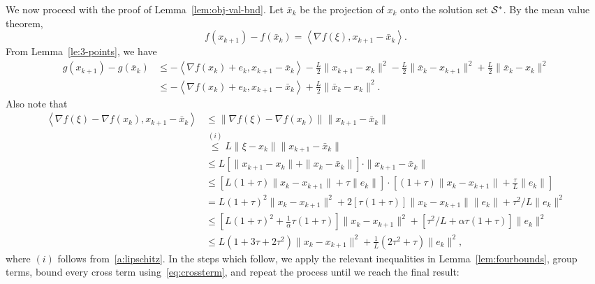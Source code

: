 We now proceed with the proof of Lemma~\ref{lem:obj-val-bnd}.  Let
$\bar{x}_k$ be the projection of $x_k$ onto the solution set
$\mathcal{S^*}$. By the mean value theorem,
\begin{equation} \label{eq:eq_mv}
  f(x_{k+1})-f(\bar{x}_k)
  = \left\langle \nabla f(\xi),x_{k+1}-\bar{x}_k\right\rangle.
\end{equation}
From Lemma~\ref{le:3-points}, we have
\begin{align} \label{eq:eq_3pt1}
g(x_{k+1})-g(\bar{x}_k) 
& \leq-\left\langle \nabla f(x_{k})
  +e_{k},x_{k+1}-\bar{x}_k\right\rangle \nonumber 
  -\frac{L}{2}\|x_{k+1}-x_{k}\|^{2}
  -\frac{L}{2}\|\bar{x}_k-x_{k+1}\|^{2}
  +\frac{L}{2}\|\bar{x}_k-x_{k}\|^{2}\nonumber \\
& \leq-\left\langle \nabla f(x_{k})
  +e_{k},x_{k+1}-\bar{x}_k\right\rangle 
  +\frac{L}{2}\|\bar{x}_k-x_{k}\|^{2}.
\end{align}
Also note that
\begin{align*}
\left\langle \nabla f(\xi)-\nabla f(x_{k}),x_{k+1}-\bar{x}_k\right\rangle 
 &\leq\|\nabla f(\xi)-\nabla f(x_{k})\|\|x_{k+1}-\bar{x}_k\|
\\&\overset{(i)}{\leq}L\|\xi-x_{k}\|\|x_{k+1}-\bar{x}_k\|
\\&\leq L[\|x_{k+1}-x_{k}\|+\|x_{k}-\bar{x}_k\|]\cdot\|x_{k+1}-\bar{x}_k\|
\\&\leq[L(1+\tau)\|x_{k}-x_{k+1}\|+\tau\|e_{k}\|]
\cdot[(1+\tau)\|x_{k}-x_{k+1}\|+\tfrac{\tau}{L}\|e_{k}\|]
\\&= L(1+\tau)^{2}\|x_{k}-x_{k+1}\|^{2}
 +2[\tau(1+\tau)]\|x_{k}-x_{k+1}\|\|e_{k}\|+\tau^{2}/L\|e_{k}\|^{2}
\\&\leq[L(1+\tau)^{2}+\tfrac{1}{\alpha}\tau(1+\tau)]\|x_{k}-x_{k+1}\|^{2}
+[\tau^{2}/L+\alpha\tau(1+\tau)]\|e_{k}\|^{2}
\\&\leq L(1+3\tau+2\tau^{2})\|x_{k}-x_{k+1}\|^{2}+\tfrac{1}{L}(2\tau^{2}+\tau)\|e_{k}\|^{2},
\end{align*}
where $(i)$ follows from~\eqref{a:lipschitz}. In the steps which
follow, we apply the relevant inequalities in
Lemma~\ref{lem:fourbounds}, group terms, bound every cross term
using~\eqref{eq:crossterm}, and repeat the process until we reach the
final result:
